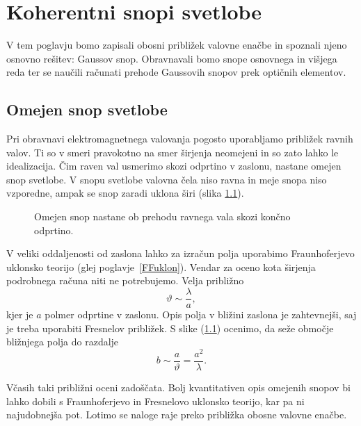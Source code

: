 
\chapter{Koherentni snopi svetlobe}
V tem poglavju bomo zapisali obosni približek valovne enačbe in spoznali 
njeno osnovno rešitev: Gaussov snop. Obravnavali bomo snope osnovnega in višjega reda ter
se naučili računati prehode Gaussovih snopov prek optičnih elementov. 

\section{Omejen snop svetlobe}
Pri obravnavi elektromagnetnega valovanja pogosto uporabljamo
približek ravnih valov. Ti so v smeri pravokotno na smer širjenja
neomejeni in so zato lahko le idealizacija. Čim raven val usmerimo skozi odprtino
v zaslonu, nastane omejen snop svetlobe. V snopu svetlobe valovna čela niso
ravna in meje snopa niso vzporedne, ampak se snop zaradi uklona širi (slika \ref{fig:Uklon-na-rezi}).
\begin{figure}[h]
\centering
\def\svgwidth{120truemm} 

\caption{Omejen snop nastane ob prehodu ravnega vala skozi končno odprtino.}
\label{fig:Uklon-na-rezi}
\end{figure}

V veliki oddaljenosti od zaslona lahko za izračun polja uporabimo
Fraunhoferjevo uklonsko teorijo (glej poglavje~\ref{FFuklon}). 
Vendar za oceno kota širjenja podrobnega računa niti ne potrebujemo. Velja približno 
\begin{equation}
\vartheta\sim\frac{\lambda}{a},
\label{eq:kot_ocena}
\end{equation}
kjer je $a$ polmer odprtine v zaslonu.
Opis polja v bližini zaslona je zahtevnejši, saj je treba uporabiti 
Fresnelov približek. S slike (\ref{fig:Uklon-na-rezi})
ocenimo, da seže območje bližnjega polja do razdalje 
\begin{equation}
b\sim\frac{a}{\vartheta}=\frac{a^{2}}{\lambda}.
\label{eq:z_ocena}
\end{equation}

Včasih taki približni oceni zadoščata. Bolj kvantitativen opis omejenih
snopov bi lahko dobili s Fraunhoferjevo in Fresnelovo uklonsko teorijo,
kar pa ni najudobnejša pot. Lotimo se naloge raje preko približka
obosne valovne enačbe.

